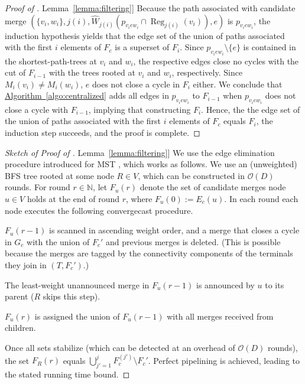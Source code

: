 \documentclass[letterpaper,11pt]{article}
\newcommand{\namedref}[2]{\hyperref[#2]{#1~\ref*{#2}}}
\newcommand{\lemmaref}[1]{\namedref{Lemma}{#1}}
\newcommand{\algref}[1]{\namedref{Algorithm}{#1}}
\newcommand{\N}{\mathbb{N}}
\newcommand{\BO}{\mathcal{O}}
\DeclareMathOperator{\reg}{Reg}
\begin{document}
\begin{proof}[Proof of \lemmaref{lemma:filtering}]
Because the path associated with candidate merge
$(\{v_i,w_i\},j(i),\hat{W}_{j(i)}(p_{v_iew_i}\cap \reg_{j(i)}(v_i)),e)$ is
$p_{v_iew_i}$, the induction hypothesis yields that the edge set of the union
of paths associated with the first $i$ elements of $F_c$ is a superset of $F_i$.
Since $p_{v_iew_i}\setminus \{e\}$ is contained in the shortest-path-trees at
$v_i$ and $w_i$, the respective edges close no cycles with the cut of $F_{i-1}$
with the trees rooted at $v_i$ and $w_i$, respectively. Since $M_i(v_i)\neq
M_i(w_i)$, $e$ does not close a cycle in $F_i$ either. We conclude that
\algref{algo:centralized} adds all edges in $p_{v_iew_i}$ to $F_{i-1}$ when
$p_{v_iew_i}$ does not close a cycle with $F_{i-1}$, implying that
constructing $F_i$. Hence, the the edge set of the union of paths associated
with the first $i$ elements of $F_c$ equals $F_i$, the induction step succeeds,
and the proof is complete.
\end{proof}

\begin{proof}[Sketch of Proof of \lemmaref{lemma:filtering}]
We use the edge elimination procedure introduced for MST
\cite{GarayKP-98,KuttenP-98}, which works as follows. We use an (unweighted) BFS
tree rooted at some node $R\in V$, which can be constructed in $\BO(D)$ rounds.
For round $r\in \N$, let $F_u(r)$ denote the set of candidate merges node $u\in
V$ holds at the end of round $r$, where $F_u(0):=E_c(u)$. In each round each
node executes the following convergecast procedure.
\begin{compactenum}
\item ${F}_u(r-1)$ is scanned in ascending weight order, and a merge that closes
a cycle in $G_c$ with the union of $F_c'$ and previous merges is deleted. (This
is possible because the merges are tagged by the connectivity components of
the terminals they join in $(T,F_c')$.)
\item The least-weight unannounced merge in $F_u(r-1)$ is announced by $u$ to
its parent ($R$ skips this step).
\item ${F}_u(r)$ is assigned the union of $F_u(r-1)$ with all merges received
from children.
\end{compactenum}
Once all sets stabilize (which can be detected at an overhead of $\BO(D)$
rounds), the set $F_R(r)$ equals $\bigcup_{j'=1}^j F_c^{(j')}\setminus F_c'$.
Perfect pipelining is achieved, leading to the stated running time bound.
\end{proof}
\end{document}
